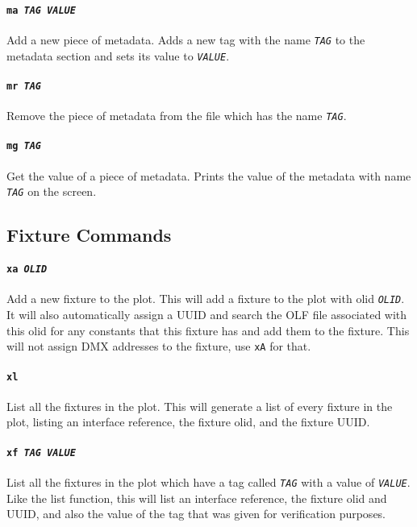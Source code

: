 \documentclass[a4paper]{article}
\begin{document}
\paragraph{\texttt{ma \textit{TAG VALUE}}}
Add a new piece of metadata. Adds a new tag with the name \texttt{\textit{TAG}}
to the metadata section and sets its value to \texttt{\textit{VALUE}}.

\paragraph{\texttt{mr \textit{TAG}}}
Remove the piece of metadata from the file which has the name 
\texttt{\textit{TAG}}.

\paragraph{\texttt{mg \textit{TAG}}}
Get the value of a piece of metadata. Prints the value of the metadata with
name \texttt{\textit{TAG}} on the screen.

\subsection{Fixture Commands}

\paragraph{\texttt{xa \textit{OLID}}}
Add a new fixture to the plot. This will add a fixture to the plot with olid 
\texttt{\textit{OLID}}. It will also automatically assign a UUID and search the 
OLF file associated with this olid for any constants that this fixture has and 
add them to the fixture. This will not assign DMX addresses to the fixture,
use \texttt{xA} for that.

\paragraph{\texttt{xl}}
List all the fixtures in the plot. This will generate a list of every fixture 
in the plot, listing an interface reference, the fixture olid, and the fixture 
UUID.

\paragraph{\texttt{xf \textit{TAG VALUE}}}
List all the fixtures in the plot which have a tag called \texttt{\textit{TAG}} 
with a value of \texttt{\textit{VALUE}}. Like the list function, this will list 
an interface reference, the fixture olid and UUID, and also the value of the 
tag that was given for verification purposes.
\end{document}
